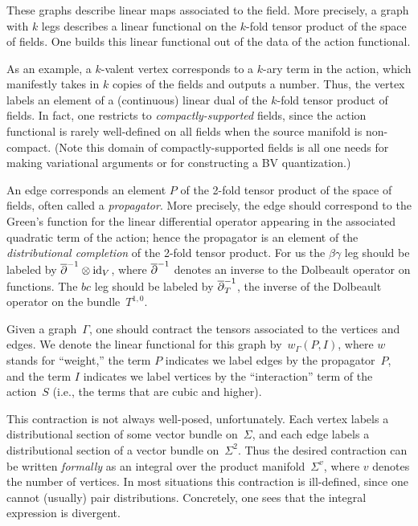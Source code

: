 \subsubsection{}

These graphs describe linear maps associated to the field.
More precisely, a graph with $k$ legs describes a linear functional on the $k$-fold tensor product of the space of fields.
One builds this linear functional out of the data of the action functional.

As an example, a $k$-valent vertex corresponds to a $k$-ary term in the action,
which manifestly takes in $k$ copies of the fields and outputs a number.
Thus, the vertex labels an element of a (continuous) linear dual of the $k$-fold tensor product of fields.
In fact, one restricts to {\em compactly-supported} fields,
since the action functional is rarely well-defined on all fields when the source manifold is non-compact.
(Note this domain of compactly-supported fields is all one needs for making variational arguments or for constructing a BV quantization.)

An edge corresponds an element $P$ of the 2-fold tensor product of the space of fields,
often called a {\em propagator}.
More precisely, the edge should correspond to
the Green's function for the linear differential operator 
appearing in the associated quadratic term of the action;
hence the propagator is an element of the {\em distributional completion} of the 2-fold tensor product.
For us the $\beta\gamma$ leg should be labeled by $\overline{\partial}^{-1} \otimes {\rm id}_V$,
where $\overline{\partial}^{-1}$ denotes an inverse to the Dolbeault operator on functions.
The $bc$ leg should be labeled by $\overline{\partial}^{-1}_T$, 
the inverse of the Dolbeault operator on the bundle~$T^{1,0}$.

Given a graph~$\Gamma$, one should contract the tensors associated to the vertices and edges.
We denote the linear functional for this graph by~$w_\Gamma(P,I)$,
where $w$ stands for ``weight,'' the term $P$ indicates we label edges by the propagator~$P$,
and the term $I$ indicates we label vertices by the ``interaction'' term of the action~$S$ 
(i.e., the terms that are cubic and higher).

This contraction is not always well-posed, unfortunately.
Each vertex labels a distributional section of some vector bundle on~$\Sigma$,
and each edge labels a distributional section of a vector bundle on~$\Sigma^2$.
Thus the desired contraction can be written {\em formally} as an integral over the product manifold~$\Sigma^{v}$,
where $v$ denotes the number of vertices.
In most situations this contraction is ill-defined, 
since one cannot (usually) pair distributions.
Concretely, one sees that the integral expression is divergent.

